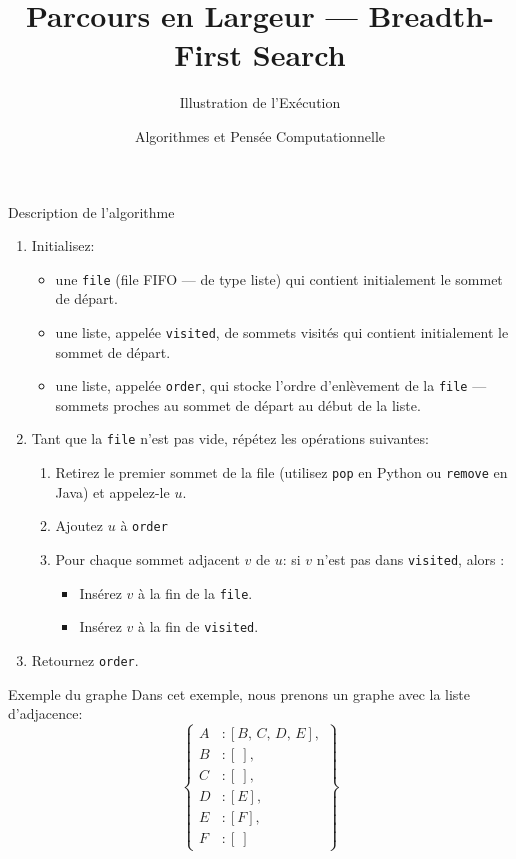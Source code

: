 \documentclass[aspectratio=169, 11pt]{beamer}
\title{Parcours en Largeur — Breadth-First Search}
\subtitle{Illustration de l'Exécution}
\author{Algorithmes et Pensée Computationnelle \newline \newline  {\small UNIL — École des Sciences Criminelles}}
\date{}
\begin{document}
\begin{frame}
\titlepage
\end{frame}


\begin{frame}{Description de l'algorithme}


\begin{enumerate}
\item Initialisez\!:
\begin{itemize}
    \item une \texttt{file} (file FIFO — de type liste) qui contient initialement le sommet de départ.
    \item une liste, appelée \texttt{visited}, de sommets visités qui contient initialement le sommet de départ.
    \item une liste, appelée \texttt{order}, qui stocke l'ordre d'enlèvement de la \texttt{file} — sommets proches au sommet de départ au début de la liste.
\end{itemize}

\item Tant que la \texttt{file} n'est pas vide, répétez les opérations suivantes\!:
\begin{enumerate}
    \item Retirez le premier sommet de la file (utilisez \texttt{pop} en Python ou \texttt{remove} en Java) et appelez-le $u$. 
    \item Ajoutez $u$ à \texttt{order}
    \item Pour chaque sommet adjacent $v$ de $u$\!: si $v$ n'est pas dans \texttt{visited}, alors :
        \begin{itemize}
            \item Insérez $v$ à la fin de la \texttt{file}.
            \item Insérez $v$ à la fin de \texttt{visited}.
        \end{itemize}
\end{enumerate}

\item Retournez \texttt{order}.
\end{enumerate}


\end{frame}

\begin{frame}{Exemple du graphe}
Dans cet exemple, nous prenons un graphe avec la liste d'adjacence:
\[
\left\{
\begin{aligned}
    A &:[B,\, C,\, D,\, E], \\
    B &:[\ ], \\
    C &:[\ ], \\
    D &:[E], \\
    E &:[F], \\
    F &:[\ ]
\end{aligned}
\right\}
\]

\end{frame}
\end{document}
